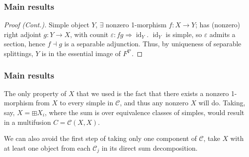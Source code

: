 \documentclass{beamer}
\newcommand{\veps}{{\varepsilon}}
\DeclareMathOperator{\id}{id}
\newcommand{\cC}{{\mathcal{C}}}
\begin{document}
\begin{frame}
\frametitle{Main results}

\begin{proof}[Proof (Cont.)]\renewcommand{\qedsymbol}{}


\pause
Simple object $Y$,
$\exists$ nonzero 1-morphism $f: X \to Y$;
has (nonzero) right adjoint $g: Y \to X$,
with counit $\veps : fg \Rightarrow \id_Y$.
$\id_Y$ is simple, so $\veps$ admits a section,
hence $f \dashv g$ is a separable adjunction.
Thus, by uniqueness of separable splittings,
$Y$ is in the essential image of $F^\nabla$.

\end{proof}

\end{frame}

\begin{frame}
\frametitle{Main results}


The only property of $X$ that we used is the fact that
there exists a nonzero 1-morphism from $X$ to every simple
in $\cC$,
and thus any nonzero $X$ will do.
\pause
Taking, say, $X = \boxplus X_i$,
where the sum is over equivalence classes of simples,
would result in a multifusion $C = \cC(X,X)$.

\pause
We can also avoid the first step of taking only one component
of $\cC$,
take $X$ with at least one object from each $\cC_j$
in its direct sum decomposition.

\end{frame}
\end{document}

